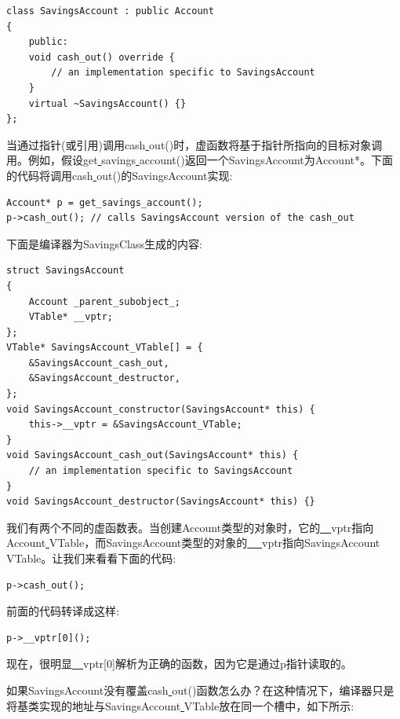 \begin{lstlisting}[caption={}]
class SavingsAccount : public Account
{
	public:
	void cash_out() override {
		// an implementation specific to SavingsAccount
	}
	virtual ~SavingsAccount() {}
};
\end{lstlisting}

当通过指针(或引用)调用cash\underline{ }out()时，虚函数将基于指针所指向的目标对象调用。例如，假设get\underline{ }savings\underline{ }account()返回一个SavingsAccount为Account*。下面的代码将调用cash\underline{ }out()的SavingsAccount实现: \par

\begin{lstlisting}[caption={}]
Account* p = get_savings_account();
p->cash_out(); // calls SavingsAccount version of the cash_out
\end{lstlisting}

下面是编译器为SavingsClass生成的内容: \par

\begin{lstlisting}[caption={}]
struct SavingsAccount
{
	Account _parent_subobject_;
	VTable* __vptr;
};
VTable* SavingsAccount_VTable[] = {
	&SavingsAccount_cash_out,
	&SavingsAccount_destructor,
};
void SavingsAccount_constructor(SavingsAccount* this) {
	this->__vptr = &SavingsAccount_VTable;
}
void SavingsAccount_cash_out(SavingsAccount* this) {
	// an implementation specific to SavingsAccount
}
void SavingsAccount_destructor(SavingsAccount* this) {}
\end{lstlisting}

我们有两个不同的虚函数表。当创建Account类型的对象时，它的\underline{~~}vptr指向Account\underline{ }VTable，而SavingsAccount类型的对象的\underline{ ~~}vptr指向SavingsAccount\underline{ }VTable。让我们来看看下面的代码: \par

\begin{lstlisting}[caption={}]
p->cash_out();
\end{lstlisting}

前面的代码转译成这样: \par

\begin{lstlisting}[caption={}]
p->__vptr[0]();
\end{lstlisting}

现在，很明显\underline{~~}vptr[0]解析为正确的函数，因为它是通过p指针读取的。\par
如果SavingsAccount没有覆盖cash\underline{ }out()函数怎么办？在这种情况下，编译器只是将基类实现的地址与SavingsAccount\underline{ }VTable放在同一个槽中，如下所示:\par

